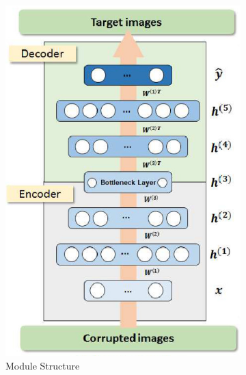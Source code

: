 \documentclass[a4paper]{ctexart}
\begin{document}
	\begin{figure}[htb] 
		\centering
		\begin{subfigure}{0.45\textwidth}
			\includegraphics[width=\linewidth]{picture/LLIE/LLNet/Module Structure}
			\captionsetup{font=scriptsize}
			\caption{Module Structure}
			\label{fig: Module Structure}
		\end{subfigure}
		\begin{subfigure}{0.18\textwidth}

\end{subfigure}
\end{figure}
\end{document}
